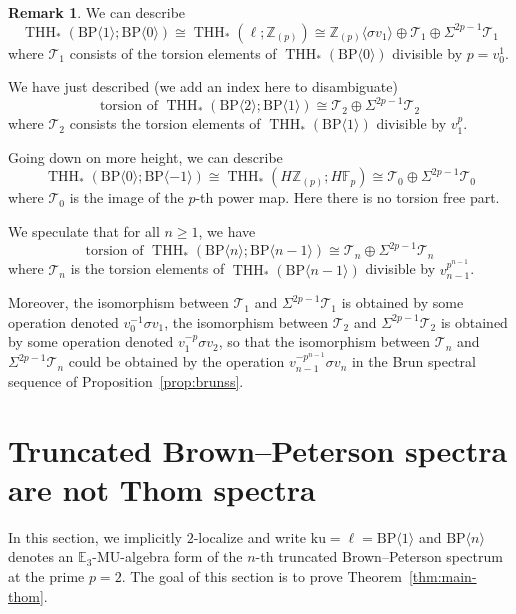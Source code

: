 \documentclass[11pt]{amsart}
\newcommand{\mr}[1]{\mathrm{#1}}
\newcommand{\Z}{\mathbb{Z}}
\newcommand{\F}{\mathbb{F}}
\newcommand{\MU}{\mr{MU}}
\newcommand{\BP}{\mr{BP}}
\newcommand{\ku}{\mathrm{ku}}
\DeclareMathOperator{\THH}{THH}
\theoremstyle{definition}
\newtheorem{remark}[equation]{Remark}
\numberwithin{equation}{section}
\numberwithin{figure}{section}
\begin{document}
\begin{remark}
  We can describe
  \[
    \THH_*(\BP \langle 1 \rangle; \BP \langle 0 \rangle) \cong \THH_*(\ell; \Z_{(p)}) \cong \Z_{(p)}\langle \sigma v_1 \rangle \oplus \mathcal{T}_1 \oplus \Sigma^{2p - 1} \mathcal{T}_1
  \]
  where $\mathcal{T}_1$ consists of the torsion elements of $\THH_*(\BP \langle 0 \rangle)$ divisible by $p = v_0^1$.

  We have just described (we add an index here to disambiguate)
  \[
    \text{torsion of } \THH_*(\BP \langle 2 \rangle; \BP \langle 1 \rangle)\cong  \mathcal{T}_2 \oplus \Sigma^{2p - 1} \mathcal{T}_2
  \]
  where $\mathcal{T}_2$ consists the torsion elements of $\THH_*(\BP \langle 1 \rangle)$ divisible by $v_1^p$.

  Going down on more height, we can describe
  \[
    \THH_*(\BP \langle 0 \rangle; \BP \langle -1 \rangle) \cong \THH_*(H \Z_{(p)}; H\F_p) \cong \mathcal{T}_0 \oplus \Sigma^{2p - 1} \mathcal{T}_0
  \]
  where $\mathcal{T}_0$ is the image of the $p$-th power map. Here there is no torsion free part. 
  
  We speculate that for all $n \geq 1$, we have
  \[
    \text{torsion of } \THH_*(\BP \langle n \rangle; \BP \langle n-1 \rangle) \cong  \mathcal{T}_n \oplus \Sigma^{2p - 1} \mathcal{T}_n
  \]
  where $\mathcal{T}_n$ is the torsion elements of $\THH_*(\BP \langle n-1 \rangle)$ divisible by $v_{n-1}^{p^{n-1}}$.


  
  Moreover, the isomorphism between $\mathcal{T}_1$ and $\Sigma^{2p-1} \mathcal{T}_1$ is obtained by some operation  denoted $v_0^{-1} \sigma v_1$, the isomorphism between $\mathcal{T}_2$ and $\Sigma^{2p-1} \mathcal{T}_2$ is obtained by some operation denoted $v_1^{-p} \sigma v_2$, so that the isomorphism between $\mathcal{T}_n$ and $\Sigma^{2p-1} \mathcal{T}_n$ could be obtained by the operation $v_{n-1}^{-p^{n-1}} \sigma v_n$ in the Brun spectral sequence of Proposition~\ref{prop:brunss}.
\end{remark}


\section{Truncated Brown--Peterson spectra are not Thom spectra}\label{notThom}

In this section, we implicitly $2$-localize and write $\ku=\ell=\BP\langle 1\rangle$ and $\BP\langle n\rangle$ denotes an $\mathbb{E}_3$-$\MU$-algebra form of the $n$-th truncated Brown--Peterson spectrum at the prime $p=2$. 
The goal of this section is to prove Theorem~\ref{thm:main-thom}. 
\end{document}
